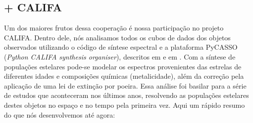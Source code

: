 \subsection{\STARLIGHT + CALIFA}
\label{sec:intro:UFSCeIAA:SLCAL}
Um dos maiores frutos dessa cooperação é nossa participação no projeto CALIFA. Dentro dele, nós analisamos todos os cubos de dados dos objetos observados utilizando o código de síntese espectral \starlight e a plataforma PyCASSO ({\em Python CALIFA \starlight synthesis organiser}), descritos em \citet{CidFernandes.etal.2013a, CidFernandes.etal.2014a} e em \citet{deAmorim.etal.2017}. Com a síntese de populações estelares pode-se modelar os espectros provenientes das estrelas de diferentes idades e composições químicas (metalicidade), além da correção pela aplicação de uma lei de extinção por poeira. Essa análise foi basilar para a série de estudos que aconteceram nos últimos anos, resolvendo as populações estelares destes objetos no espaço e no tempo pela primeira vez. Aqui um rápido resumo do que nós desenvolvemos até agora:
